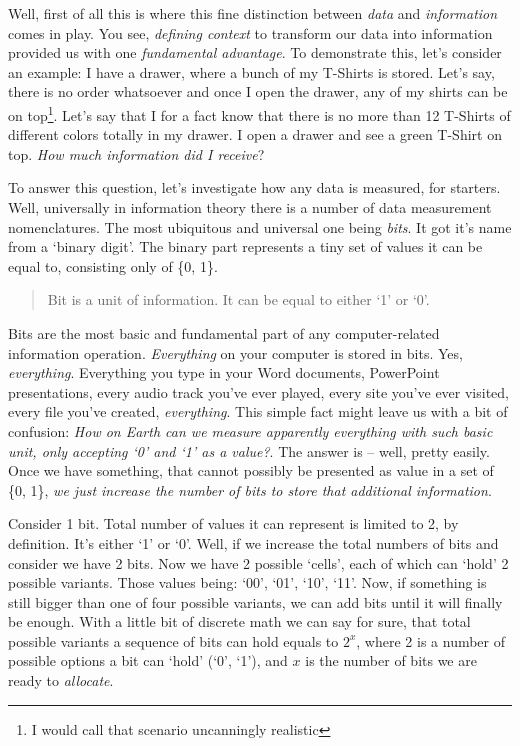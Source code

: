 \documentclass{article}
\begin{document}
            Well, first of all this is where this fine distinction between \emph{data} and \emph{information} comes in play. You see, \emph{defining context} to transform
            our data into information provided us with one \emph{fundamental advantage}. To demonstrate this, let's consider an example: I have a drawer, where a bunch
            of my T-Shirts is stored. Let's say, there is no order whatsoever and once I open the drawer, any of my shirts can be on top\footnote{I would call
            that scenario uncanningly realistic}. Let's say that I for a fact know that there is no more than 12 T-Shirts of different colors totally in my drawer.
            I open a drawer and see a green T-Shirt on top. \emph{How much information did I receive}? \par

            To answer this question, let's investigate how any data is measured, for starters. Well, universally in information theory there is a number of data 
            measurement nomenclatures. The most ubiquitous and universal one being \emph{bits}. It got it's name from a `binary digit'. The binary part represents a
            tiny set of values it can be equal to, consisting only of \{0, 1\}.

            \begin{quote}
                Bit is a unit of information. It can be equal to either `1' or `0'.
            \end{quote}

            Bits are the most basic and fundamental part of any computer-related information operation. \emph{Everything} on your computer is stored in bits. Yes, 
            \emph{everything}. Everything you type in your Word documents, PowerPoint presentations, every audio track you've ever played, every site you've ever 
            visited, every file you've created, \emph{everything}. This simple fact might leave us with a bit of confusion: \emph{How on Earth can we measure apparently
            everything with such basic unit, only accepting `0' and `1' as a value?}. The answer is -- well, pretty easily. Once we have something, that cannot possibly
            be presented as value in a set of \{0, 1\}, \emph{we just increase the number of bits to store that additional information}. \par

            Consider 1 bit. Total number of values it can represent is limited to 2, by definition. It's either `1' or `0'. Well, if we increase the total numbers
            of bits and consider we have 2 bits. Now we have 2 possible `cells', each of which can `hold' 2 possible variants. Those values being: `00', `01', `10', `11'.
            Now, if something is still bigger than one of four possible variants, we can add bits until it will finally be enough. With a little bit of discrete math
            we can say for sure, that total possible variants a sequence of bits can hold equals to $2^x$, where 2 is a number of possible options a bit can `hold' (`0', `1'), 
            and $x$ is the number of bits we are ready to \emph{allocate}.
            
\end{document}
